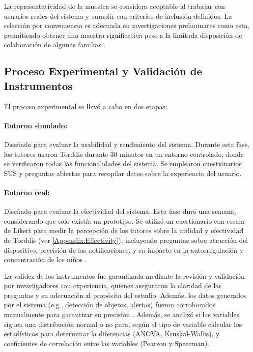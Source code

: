 La representatividad de la muestra se considera aceptable al trabajar con usuarios reales del sistema y cumplir con criterios de inclusión definidos. La selección por conveniencia es adecuada en investigaciones preliminares como esta, permitiendo obtener una muestra significativa pese a la limitada disposición de colaboración de algunas familias \citep{DiPietro2025Meta}.

\subsection{Proceso Experimental y Validación de Instrumentos}
El proceso experimental se llevó a cabo en dos etapas:

\paragraph{Entorno simulado:} Diseñado para evaluar la usabilidad y rendimiento del sistema. Durante esta fase, los tutores usaron Torddis durante 30 minutos en un entorno controlado, donde se verificaron todas las funcionalidades del sistema. Se emplearon cuestionarios SUS y preguntas abiertas para recopilar datos sobre la experiencia del usuario.

\paragraph{Entorno real:} Diseñado para evaluar la efectividad del sistema. Esta fase duró una semana, considerando que solo existía un prototipo. Se utilizó un cuestionario con escala de Likert para medir la percepción de los tutores sobre la utilidad y efectividad de Torddis (ver \ref{Appendix:Effectivity}), incluyendo preguntas sobre atracción del dispositivo, precisión de las notificaciones, y su impacto en la autorregulación y concentración de los niños \citep{Ackermans2025Young}.

La validez de los instrumentos fue garantizada mediante la revisión y validación por investigadores con experiencia, quienes aseguraron la claridad de las preguntas y su adecuación al propósito del estudio. Además, los datos generados por el sistema (e.g., detección de objetos, alertas) fueron corroborados manualmente para garantizar su precisión \citep{Wang2025Development}. Además, se analizó si las variables siguen una distribución normal o no para, según el tipo de variable calcular los estadísticos para determinar la diferencias (ANOVA, Kruskal-Wallis), y coeficientes de correlación entre las variables (Pearson y Spearman).

